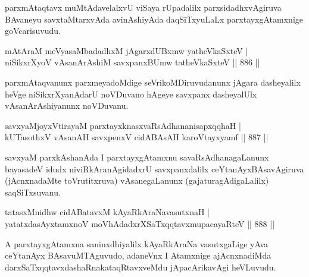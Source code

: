 \begin{artha}
parxmAtaqtavx muMtAdavelalxvU viSaya rUpadalilx parxsidadhxvAgiruva BAvaneyu savxtaMtarxvAda avinAshiyAda daqSiTxyuLaLx parxtayxgAtamxnige goVcarisuvudu.
\end{artha}


\begin{shl}
mAtAraM meVyasaMbadadhxM jAgarxdUBxmw yatheVkaSxteV | \\
niSikxrXyoV vAsanArAshiM savxpanxBUmw tatheVkaSxteV \hfill||  886 ||  
\end{shl}

\begin{artha}
parxmAtaqvanunx parxmeyadoMdige seVrikoMDiruvudanunx jAgara dasheyalilx heVge niSikxrXyanAdarU noVDuvano hAgeye savxpanx dasheyalUlx vAsanArAshiyanunx noVDuvanu.
\end{artha}


\begin{shl}
savxyaMjoyxVtirayaM parxtayxknasxvaRsAdhananisapxqqhaH | \\
kUTasothxV vAsanAH savxpenxV cidABAsAH karoVtayxyamf \hfill||  887 ||  
\end{shl}

\begin{artha}
savxyaM parxkAshanAda I parxtayxgAtamxnu savaRsAdhanagaLanunx bayasadeV idudx niviRkAranAgidadxrU savxpanxdalilx ceYtanAyxBAsavAgiruva (jAcnxnadaMte toVrutitxruva) vAsanegaLanunx (gajaturagAdigaLalilx) saqSiTxsuvanu.
\end{artha}


\begin{shl}
tatasxMnidhw cidABatavxM kAyaRkAraNavasutxnaH | \\
yatatxdasAyx\s \s tamxnoV moVhAdadxrXSaTxqqtavxmupacayaRteV \hfill||  888 ||  
\end{shl}

\begin{artha}
A parxtayxgAtamxna saninxdhiyalilx kAyaRkAraNa vasutxgaLige yAva ceYtanAyx BAsavuMTAguvudo, adaneVnx I Atamxnige ajAcnxnadiMda darxSaTxqqtavxdashaRnakataqRtavxveMdu jApacArikavAgi heVLuvudu.
\end{artha}

